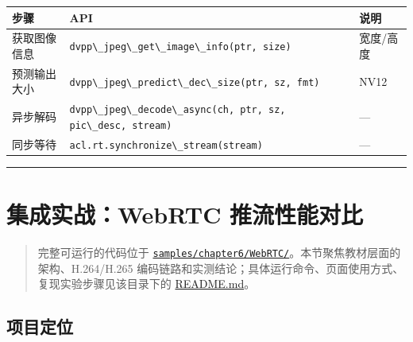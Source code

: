 \begin{longtable}[]{@{}
  >{\raggedright\arraybackslash}p{}
  >{\raggedright\arraybackslash}p{}
  >{\raggedright\arraybackslash}p{}@{}}
\toprule\noalign{}
\begin{minipage}[b]{\linewidth}\raggedright
步骤
\end{minipage} & \begin{minipage}[b]{\linewidth}\raggedright
API
\end{minipage} & \begin{minipage}[b]{\linewidth}\raggedright
说明
\end{minipage} \\
\midrule\noalign{}
\endhead
\bottomrule\noalign{}
\endlastfoot
获取图像信息 &
\passthrough{\lstinline!dvpp\_jpeg\_get\_image\_info(ptr, size)!} &
宽度/高度 \\
预测输出大小 &
\passthrough{\lstinline!dvpp\_jpeg\_predict\_dec\_size(ptr, sz, fmt)!} &
NV12 \\
异步解码 &
\passthrough{\lstinline!dvpp\_jpeg\_decode\_async(ch, ptr, sz, pic\_desc, stream)!}
& --- \\
同步等待 & \passthrough{\lstinline!acl.rt.synchronize\_stream(stream)!}
& --- \\
\end{longtable}

\begin{center}\rule{0.5\linewidth}{0.5pt}\end{center}

\section{集成实战：WebRTC 推流性能对比}\label{src-book-chapter6-h145}

\begin{quote}
完整可运行的代码位于
\href{https://github.com/zhouxzh/Ascend310/tree/master/samples/chapter6/WebRTC/}{\passthrough{\lstinline!samples/chapter6/WebRTC/!}}。本节聚焦教材层面的架构、H.264/H.265
编码链路和实测结论；具体运行命令、页面使用方式、复现实验步骤见该目录下的
\href{https://github.com/zhouxzh/Ascend310/blob/master/samples/chapter6/WebRTC/README.md}{README.md}。
\end{quote}

\subsection{项目定位}\label{src-book-chapter6-h146}

